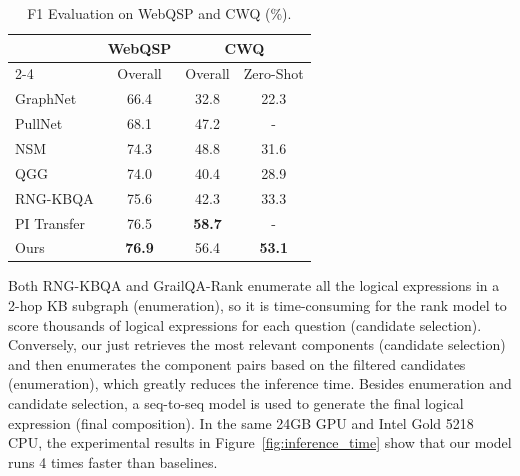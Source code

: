 \begin{table}\centering
\caption{\label{tb:webqsp} F1 Evaluation on WebQSP and CWQ (\%).}
\small
\begin{tabular}{lc|cc}
\hline
 & WebQSP & \multicolumn{2}{c}{CWQ} \\ \cline{2-4} &Overall    & Overall      & Zero-Shot    \\ \hline
GraphNet                                            & 66.4   & 32.8 & 22.3          \\
PullNet & 68.1   & 47.2 & -             \\
NSM    & 74.3   & 48.8 & 31.6          \\ \hline
QGG      & 74.0   & 40.4 & 28.9          \\
RNG-KBQA     & 75.6   & 42.3 & 33.3          \\ 
PI Transfer                        & 76.5   & \textbf{58.7} & -             \\ \hline
Ours                                                & \textbf{76.9}   & 56.4 & \textbf{53.1}          \\ \hline
\end{tabular}
\end{table}			

Both RNG-KBQA and GrailQA-Rank enumerate all the logical expressions in a 2-hop KB subgraph (enumeration), so it is time-consuming for the rank model to score thousands of logical expressions for each question (candidate selection). Conversely, our \smodel just retrieves the most relevant components (candidate selection) and then enumerates the component pairs based on the filtered candidates (enumeration), which greatly reduces the inference time. Besides enumeration and candidate selection, a seq-to-seq model is used to generate the final logical expression (final composition).
In the same 24GB GPU and Intel Gold 5218 CPU, the experimental results in Figure~\ref{fig:inference_time} show that our model runs 4 times faster than baselines.

